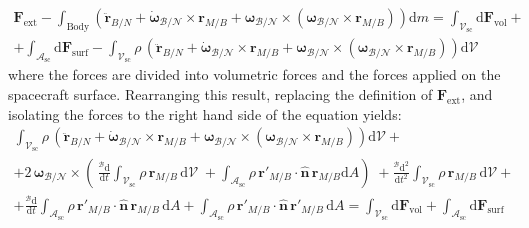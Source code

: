 \begin{multline}
	\bm{F}_{\text{ext}} - \int_{\text{Body}}\left(\ddot{\bm{r}}_{B/N} + \dot{\bm{\omega}}_{\mathcal{B}/\mathcal{N}}\times\bm{r}_{M/B} + \bm{\omega}_{\mathcal{B}/\mathcal{N}} \times\left(\bm{\omega}_{\mathcal{B}/\mathcal{N}} \times\bm{r}_{M/B}\right)\right)\text{d}m 
	= \int_{\mathcal{V}_{\text{sc}}} \text{d}\bm{F}_{\text{vol}}+\\ +\int_{\mathcal{A}_{\text{sc}}} \text{d}\bm{F}_{\text{surf}} - \int_{\mathcal{V}_{\text{sc}}}\rho\,\left(\ddot{\bm{r}}_{B/N} + \dot{\bm{\omega}}_{\mathcal{B}/\mathcal{N}}\times\bm{r}_{M/B} + \bm{\omega}_{\mathcal{B}/\mathcal{N}} \times\left(\bm{\omega}_{\mathcal{B}/\mathcal{N}} \times\bm{r}_{M/B}\right)\right)\text{d}\mathcal{V}
\end{multline}  
\noindent
where the forces are divided into volumetric forces and the forces applied on the spacecraft surface. Rearranging this result, replacing the definition of $\bm{F}_{\text{ext}}$, and isolating the forces to the right hand side of the equation yields:
\begin{multline}\label{eq:ComplTranslEOM}
	\int_{\mathcal{V}_{\text{sc}}}\rho\,\left(\ddot{\bm{r}}_{B/N} + \dot{\bm{\omega}}_{\mathcal{B}/\mathcal{N}}\times\bm{r}_{M/B} + \bm{\omega}_{\mathcal{B}/\mathcal{N}} \times\left(\bm{\omega}_{\mathcal{B}/\mathcal{N}} \times\bm{r}_{M/B}\right)\right)\text{d}\mathcal{V} +\\+
	2\,\bm{\omega}_{\mathcal{B}/\mathcal{N}}\times\left(\,\frac{^{\mathcal{B}} \text{d}}{\text{d}t}\int_{\mathcal{V}_{\text{sc}}} \rho\,\bm{r}_{M/B}\,\text{d}\mathcal{V}\; + \int_{\mathcal{A}_{\text{sc}}} \rho\,\bm{r}'_{M/B}\cdot\bm{\hat{n}}\,\bm{r}_{M/B}\text{d}A\right) \;+ 	 \frac{^{\mathcal{B}} \text{d}^2}{\text{d}t^2}\int_{\mathcal{V}_{\text{sc}}} \rho\,\bm{r}_{M/B} \,\text{d}\mathcal{V} +\\+ \frac{^{\mathcal{B}} \text{d}}{\text{d}t} \int_{\mathcal{A}_\text{sc}} \rho\,\bm{r}'_{M/B}\cdot\bm{\hat{n}} \,\bm{r}_{M/B}\,\text{d}A + \int_{\mathcal{A}_\text{sc}} \rho\,\bm{r}'_{M/B}\cdot\bm{\hat{n}} \,\bm{r}'_{M/B}\,\text{d}A  
	= \int_{\mathcal{V}_{\text{sc}}} \text{d}\bm{F}_{\text{vol}} +\int_{\mathcal{A}_{\text{sc}}} \text{d}\bm{F}_{\text{surf}}
\end{multline}

